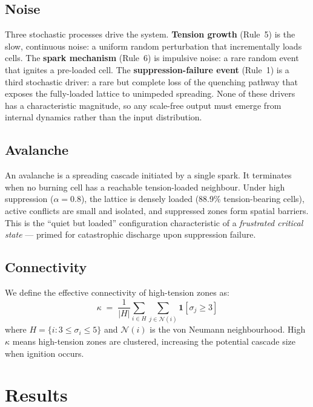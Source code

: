 \documentclass[12pt,a4paper]{article}
\begin{document}
\subsection{Noise}

Three stochastic processes drive the system. \textbf{Tension growth} (Rule~5) is the
slow, continuous noise: a uniform random perturbation that incrementally loads cells.
The \textbf{spark mechanism} (Rule~6) is impulsive noise: a rare random event that
ignites a pre-loaded cell. The \textbf{suppression-failure event} (Rule~1) is a third
stochastic driver: a rare but complete loss of the quenching pathway that exposes the
fully-loaded lattice to unimpeded spreading. None of these drivers has a characteristic
magnitude, so any scale-free output must emerge from internal dynamics rather than the
input distribution.

\subsection{Avalanche}

An avalanche is a spreading cascade initiated by a single spark. It terminates when no
burning cell has a reachable tension-loaded neighbour. Under high suppression
($\alpha = 0.8$), the lattice is densely loaded (88.9\% tension-bearing cells), active
conflicts are small and isolated, and suppressed zones form spatial barriers. This is
the ``quiet but loaded'' configuration characteristic of a \emph{frustrated critical
state} --- primed for catastrophic discharge upon suppression failure.

\subsection{Connectivity}

We define the effective connectivity of high-tension zones as:
\begin{equation}
  \kappa \;=\; \frac{1}{|H|}\sum_{i\in H}\sum_{j\in\mathcal{N}(i)}
               \mathbf{1}[\sigma_j \ge 3]
  \label{eq:connectivity}
\end{equation}
where $H = \{i : 3\le\sigma_i\le 5\}$ and $\mathcal{N}(i)$ is the von Neumann
neighbourhood. High $\kappa$ means high-tension zones are clustered, increasing the
potential cascade size when ignition occurs.

\section{Results}
\label{sec:results}
\end{document}
